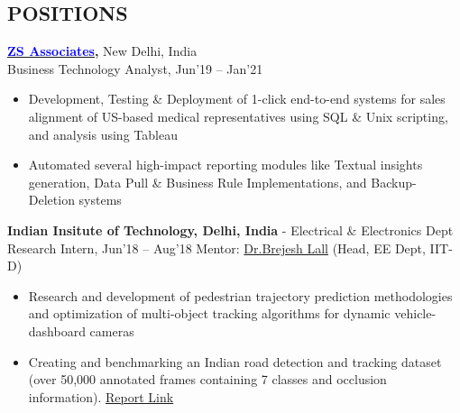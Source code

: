 \documentclass[11pt]{res} %
\newcommand{\titlegap}{5pt} %
\newcommand{\sectgap}{0.05in} %
\begin{document}
\begin{resume}

\section{POSITIONS}
\vspace{\titlegap}
{\bf \href{https://www.zs.com/}{\textcolor{blue}{ZS Associates}},} New Delhi, India\\
Business Technology Analyst, Jun'19 -- Jan'21
\begin{itemize}
    \item Development, Testing \& Deployment of 1-click end-to-end systems for sales alignment of US-based medical representatives using SQL \& Unix scripting, and analysis using Tableau
    \item Automated several high-impact reporting modules like Textual insights generation, Data Pull \& Business Rule Implementations, and Backup-Deletion systems
\end{itemize}



{\bf Indian Insitute of Technology, Delhi, India} - Electrical \& Electronics Dept\\
Research Intern, Jun'18 – Aug'18 \hfill Mentor: \href{https://web.iitd.ac.in/~brejesh/}{Dr.Brejesh Lall} (Head, EE Dept, IIT-D)
\begin{itemize}
    \item Research and development of pedestrian trajectory prediction methodologies and optimization of multi-object tracking algorithms for dynamic vehicle-dashboard cameras
    \item Creating and benchmarking an Indian road detection and tracking dataset (over 50,000 annotated frames containing 7 classes and occlusion information). \textcolor{blue}{\href{https://drive.google.com/file/d/1VzW1S9UInuxXegAi2ursUIjQHOWDsS6R/view?usp=sharing}{Report Link}}
\end{itemize} 


\end{resume}
\end{document}
